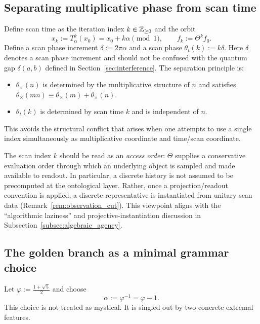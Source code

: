 \subsection{Separating multiplicative phase from scan time}
Define scan time as the iteration index $k\in\mathbb{Z}_{\ge 0}$ and the orbit
$$
x_k:=T_\alpha^k(x_0)=x_0+k\alpha\pmod{1},\qquad f_k:=\Theta^k f_0.
$$
Define a scan phase increment $\delta:=2\pi\alpha$ and a scan phase $\theta_t(k):=k\delta$. Here $\delta$ denotes a scan phase increment and should not be confused with the quantum gap $\delta(a,b)$ defined in Section~\ref{sec:interference}. The separation principle is:

\begin{itemize}
    \item $\theta_\times(n)$ is determined by the multiplicative structure of $n$ and satisfies $\theta_\times(mn)\equiv\theta_\times(m)+\theta_\times(n)$.
    \item $\theta_t(k)$ is determined by scan time $k$ and is independent of $n$.
\end{itemize}

This avoids the structural conflict that arises when one attempts to use a single index simultaneously as multiplicative coordinate and time/scan coordinate.

\begin{remark}
\label{rem:scan_access_order}
The scan index $k$ should be read as an \emph{access order}: $\Theta$ supplies a conservative evaluation order through which an underlying object is sampled and made available to readout.
In particular, a discrete history is not assumed to be precomputed at the ontological layer.
Rather, once a projection/readout convention is applied, a discrete representative is instantiated from unitary scan data (Remark~\ref{rem:observation_cut}).
This viewpoint aligns with the ``algorithmic laziness'' and projective-instantiation discussion in Subsection~\ref{subsec:algebraic_agency}.
\end{remark}

\subsection{The golden branch as a minimal grammar choice}
Let $\varphi:=\frac{1+\sqrt{5}}{2}$ and choose
$$
\alpha:=\varphi^{-1}=\varphi-1.
$$
This choice is not treated as mystical. It is singled out by two concrete extremal features.

